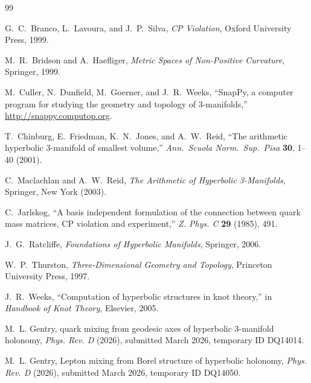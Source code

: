 \documentclass[12pt]{article}
\theoremstyle{definition}
\theoremstyle{remark}
\begin{document}
\begin{thebibliography}{99}

G.~C.~Branco, L.~Lavoura, and J.~P.~Silva,
\emph{CP Violation},
Oxford University Press, 1999.

M.~R.~Bridson and A.~Haefliger,
\emph{Metric Spaces of Non-Positive Curvature},
Springer, 1999.

M.~Culler, N.~Dunfield, M.~Goerner, and J.~R.~Weeks,
``SnapPy, a computer program for studying the geometry and topology
of 3‑manifolds,'' \url{http://snappy.computop.org}.

T.~Chinburg, E.~Friedman, K.~N.~Jones, and A.~W.~Reid,
``The arithmetic hyperbolic 3-manifold of smallest volume,''
\emph{Ann.\ Scuola Norm.\ Sup.\ Pisa} \textbf{30}, 1--40 (2001).

C.~Maclachlan and A.~W.~Reid,
\emph{The Arithmetic of Hyperbolic 3-Manifolds},
Springer, New York (2003).

C.~Jarlskog,
``A basis independent formulation of the connection between quark mass
matrices, CP violation and experiment,''
\emph{Z. Phys. C} \textbf{29} (1985), 491.

J.~G.~Ratcliffe,
\emph{Foundations of Hyperbolic Manifolds},
Springer, 2006.

W.~P.~Thurston,
\emph{Three-Dimensional Geometry and Topology},
Princeton University Press, 1997.

J.~R.~Weeks,
``Computation of hyperbolic structures in knot theory,''
in \emph{Handbook of Knot Theory}, Elsevier, 2005.


M.~L. Gentry,
 quark mixing from geodesic axes of hyperbolic 3-manifold holonomy,
\newblock \emph{Phys. Rev. D} (2026), submitted March 2026, temporary {ID} DQ14014.

M.~L. Gentry,
\newblock Lepton mixing from Borel structure of hyperbolic holonomy,
\newblock \emph{Phys. Rev. D} (2026), submitted March 2026, temporary {ID} DQ14050.
\end{thebibliography}
\end{document}

